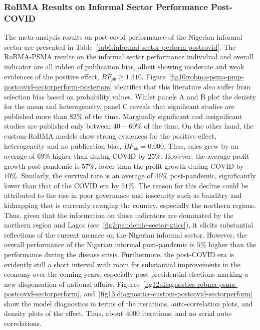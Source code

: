 \documentclass[12pt, english]{article}
\begin{document}
    \subsubsection{RoBMA Results on Informal Sector Performance Post-COVID}\label{subsubsec:robma-results-on-informal-sector-performance-post-covid}
    The meta-analysis results on post-covid performance of the Nigerian informal sector are presented in Table~\ref{tab6:informal-sector-perform-postcovid}. The RoBMA-PSMA results on the informal sector performance individual and overall indicator are all ridden of publication bias, albeit showing moderate and weak evidences of the positive effect, $BF_{pb} \geq 1.510$. Figure~\ref{fig10:robma-psma-pmp-postcovid-sectorperform-posteriors} identifies that this literature also suffer from selection bias based on probability values. Whilst panels A and B plot the denisty for the mean and heterogeneity, panel C reveals that significant studies are published more than $82\%$ of the time. Marginally significant and insignificant studies are published only between $40-60\%$ of the time. On the other hand, the custom-RoBMA models show strong evidences for the positive effect, heterogeneity and no publication bias, $BF_{pb} = 0.000$. Thus, sales grew by an average of $69\%$ higher than during COVID by $25\%$. However, the average profit growth post-pandemic is $57\%$, lower than the profit growth during COVID by $10\%$. Similarly, the survival rate is an average of $46\%$ post-pandemic, significantly lower than that of the COVID era by $51\%$. The reason for this decline could be attributed to the rise in poor governance and insecurity such as banditry and kidnapping that is currently ravaging the country, especially the northern regions. Thus, given that the information on these indicators are dominated by the northern region and Lagos (see~\ref{fig2:pandemic-sector-xtics}), it elicits substantial reflections of the current menace on the Nigerian informal sector. However, the overall performance of the Nigerian informal post-pandemic is $5\%$ higher than the performance during the disease crisis. Furthermore, the post-COVID era is evidently still a short interval with room for substantial improvements in the economy over the coming years, especially post-presidential elections marking a new dispensation of national affairs. Figures~\ref{fig12:diagnostics-robma-psma-postcovid-sectorperform}, and~\ref{fig13:diagnostics-custom-postcovid-sectorperform} show the model diagnostics in terms of the iterations, auto-correlation plots, and density plots of the effect. Thus, about $4000$ iterations, and no serial auto-correlations.
\end{document}
